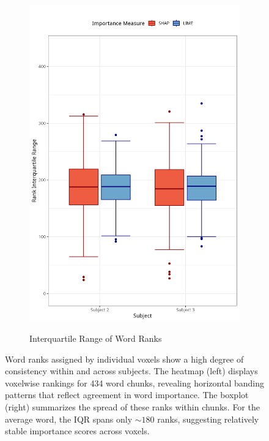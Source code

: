 \documentclass[10pt,letterpaper]{article}
\begin{document}
\begin{figure}[ht]
\begin{subfigure}[t]{0.35\textwidth}
        \centering
        \caption{Interquartile Range of Word Ranks}
        \includegraphics[width=\textwidth]{figs/boxplot_laws.png}
        \label{subfig:boxplot_laws}
    \end{subfigure}
    \caption{Word ranks assigned by individual voxels show a high degree of consistency within and across subjects. The heatmap (left) displays voxelwise rankings for 434 word chunks, revealing horizontal banding patterns that reflect agreement in word importance. The boxplot (right) summarizes the spread of these ranks within chunks. For the average word, the IQR spans only ${\sim}180$ ranks, suggesting relatively stable importance scores across voxels.}
    \label{fig:laws_voxelwise}
\end{figure}
\end{document}
